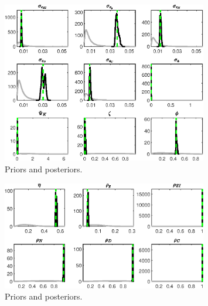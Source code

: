  
\begin{figure}[H]
\centering
\includegraphics[width=0.80\textwidth]{BRS_growth_ext_util/Output/BRS_growth_ext_util_PriorsAndPosteriors1}
\caption{Priors and posteriors.}\label{Fig:PriorsAndPosteriors:1}
\end{figure}
 
\begin{figure}[H]
\centering
\includegraphics[width=0.80\textwidth]{BRS_growth_ext_util/Output/BRS_growth_ext_util_PriorsAndPosteriors2}
\caption{Priors and posteriors.}\label{Fig:PriorsAndPosteriors:2}
\end{figure}
 
